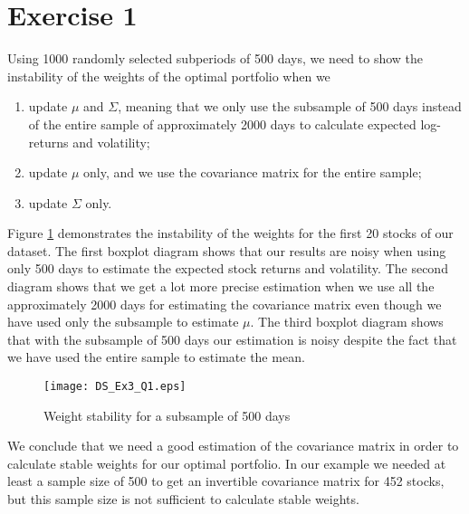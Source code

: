

\section*{Exercise 1}

Using 1000 randomly selected subperiods of 500 days, we need to show the instability of the weights of the optimal portfolio when we
\begin{enumerate}
\item update $\mu$ and $\Sigma$, meaning that we only use the subsample of 500 days instead of the entire sample of approximately 2000 days to calculate expected log-returns and volatility; 
\item update $\mu$ only, and we use the covariance matrix for the entire sample;
\item update $\Sigma$ only.
\end{enumerate}

Figure \ref{fig1} demonstrates the instability of the weights for the first 20 stocks of our dataset. The first boxplot diagram shows that our results are noisy when using only 500 days to estimate the expected stock returns and volatility. The second diagram shows that we get a lot more precise estimation when we use all the approximately 2000 days for estimating the covariance matrix even though we have used only the subsample to estimate $\mu$. The third boxplot diagram shows that with the subsample of 500 days our estimation is noisy despite the fact that we have used the entire sample to estimate the mean. 

\begin{figure}[H]
\texttt{[image: DS\_Ex3\_Q1.eps]}
\caption{Weight stability for a subsample of 500 days}
\label{fig1}
\end{figure}

We conclude that we need a good estimation of the covariance matrix in order to calculate stable weights for our optimal portfolio. In our example we needed at least a sample size of 500 to get an invertible covariance matrix for 452 stocks, but this sample size is not sufficient to calculate stable weights.  
 


